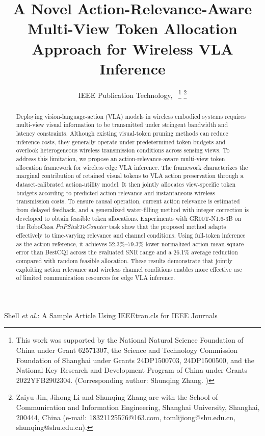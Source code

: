 \documentclass[lettersize,journal]{IEEEtran}
\theoremstyle{custom}
\begin{document}
\title{A Novel Action-Relevance-Aware Multi-View Token Allocation Approach for Wireless VLA Inference}

\author{IEEE Publication Technology,~
\thanks{This work was supported by the National Natural Science Foundation of China under Grant 62571307, the Science and Technology Commission Foundation of Shanghai under Grants 24DP1500703, 24DP1500500, and the National Key Research and Development Program of China under Grants 2022YFB2902304. (Corresponding author: Shunqing Zhang. )}%
\thanks{Zaiyu Jin, Jihong Li and Shunqing Zhang are with the School of Communication and Information Engineering, Shanghai University, Shanghai, 200444, China (e-mail: 18321125576@163.com, tomlijiong@shu.edu.cn, shunqing@shu.edu.cn). }}

%
{Shell \MakeLowercase{\textit{et al.}}: A Sample Article Using IEEEtran.cls for IEEE Journals}


\maketitle

\begin{abstract}
Deploying vision-language-action (VLA) models in wireless embodied
systems requires multi-view visual information to be transmitted under
stringent bandwidth and latency constraints. Although existing
visual-token pruning methods can reduce inference costs, they generally
operate under predetermined token budgets and overlook heterogeneous
wireless transmission conditions across sensing views. To address this
limitation, we propose an action-relevance-aware multi-view token
allocation framework for wireless edge VLA inference. The framework
characterizes the marginal contribution of retained visual tokens to
VLA action preservation through a dataset-calibrated action-utility
model. It then jointly allocates view-specific token budgets according
to predicted action relevance and instantaneous wireless transmission
costs. To ensure causal operation, current action relevance is estimated
from delayed feedback, and a generalized water-filling method with
integer correction is developed to obtain feasible token allocations.
Experiments with GR00T-N1.6-3B on the RoboCasa
\emph{PnPSinkToCounter} task show that the proposed method adapts
effectively to time-varying relevance and channel conditions. Using
full-token inference as the action reference, it achieves
52.3\%--79.3\% lower normalized action mean-square error than BestCQI
across the evaluated SNR range and a 26.1\% average reduction compared
with random feasible allocation. These results demonstrate that jointly
exploiting action relevance and wireless channel conditions enables more
effective use of limited communication resources for edge VLA
inference.
\end{abstract}
\end{document}
